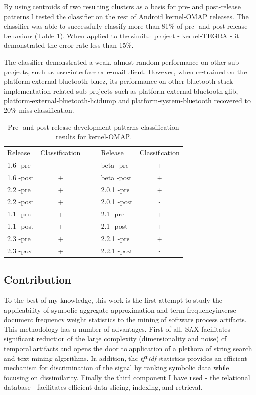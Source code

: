 \documentclass[conference]{worldcomp}
\begin{document}
By using centroids of two resulting clusters as a basis for pre- and post-release patterns I tested 
the classifier on the rest of Android kernel-OMAP releases. The classifier was able to successfully classify 
more than 81\% of pre- and post-release behaviors (Table \ref{tab:success}). 
When applied to the similar project - kernel-TEGRA - it demonstrated the error rate less than 15\%.

The classifier demonstrated a weak, almost random performance on other sub-projects, such as user-interface
or e-mail client. However, when re-trained on the platform-external-bluetooth-bluez, its performance on 
other bluetooth stack implementation related sub-projects such as platform-external-bluetooth-glib, 
platform-external-bluetooth-hcidump and platform-system-bluetooth recovered to 20\% miss-classification.

\begin{table}
  \caption{Pre- and post-release development patterns classification results for kernel-OMAP.}
  \label{tab:success}
  \begin{tabular}{ | l | c | c c | l | c |}
  \cline{1-2} \cline{5-6}
  Release & Classification& & & Release & Classification\\
  \cline{1-2} \cline{5-6}
1.6 -pre & - & & & beta -pre & + \\
1.6 -post & + & & & beta -post & + \\
2.2 -pre & + & & & 2.0.1 -pre & + \\
2.2 -post & + & & & 2.0.1 -post & -\\
1.1 -pre & + & & & 2.1 -pre & + \\
1.1 -post & + & & & 2.1 -post & + \\
2.3 -pre & + & & & 2.2.1 -pre & + \\
2.3 -post & + & & & 2.2.1 -post & - \\ 
  \cline{1-2} \cline{5-6}
  \end{tabular}
\end{table}

\subsection{Contribution}
To the best of my knowledge, this work is the first attempt to study the applicability
of symbolic aggregate approximation and term frequency\textendash inverse document frequency
weight statistics to the mining of software process artifacts. 
This methodology has a number of advantages. First of all, SAX facilitates significant 
reduction of the large complexity (dimensionality and noise) of temporal artifacts 
and opens the door to application of a plethora of string search and text-mining algorithms.
In addition, the \textit{tf$\ast$idf} statistics provides an efficient mechanism for 
discrimination of the signal by ranking symbolic data while focusing on dissimilarity.
Finally the third component I have used - the relational database - facilitates 
efficient data slicing, indexing, and retrieval.
\end{document}
